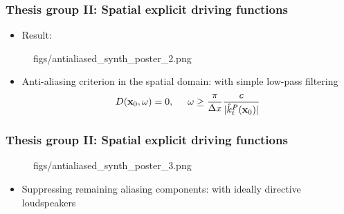 \documentclass{beamer}
\begin{document}
\begin{frame}
\frametitle{Thesis group II: Spatial explicit driving functions}
\begin{itemize}
\small
\item Result:	
\end{itemize}
\vspace{-7mm}
	\begin{figure}
	\begin{overpic}[width = 0.65\columnwidth ]{figs/antialiased_synth_poster_2.png}
	\end{overpic}
	\end{figure} 
	\vspace{-5mm}
\begin{tcolorbox}
		\begin{itemize}
\small
		\item Anti-aliasing criterion in the spatial domain: with simple low-pass filtering 
		\begin{equation*}
		D(\mathbf{x}_0,\omega) = 0, \hspace{5mm} \omega \geq \frac{\pi}{\Delta x} \frac{c}{| \hat{k}^P_t(\mathbf{x}_0) |}
		\end{equation*}
		\end{itemize}
\end{tcolorbox}

\end{frame}  
\begin{frame}
\frametitle{Thesis group II: Spatial explicit driving functions}
	\vspace{-3mm}
	\begin{figure}
	\begin{overpic}[width = 0.65\columnwidth ]{figs/antialiased_synth_poster_3.png}
	\end{overpic}
	\end{figure} 
	\vspace{-6mm}
		\begin{itemize}
		\item Suppressing remaining aliasing components: with ideally directive loudspeakers
		\end{itemize}
\end{frame}  
\end{document}
